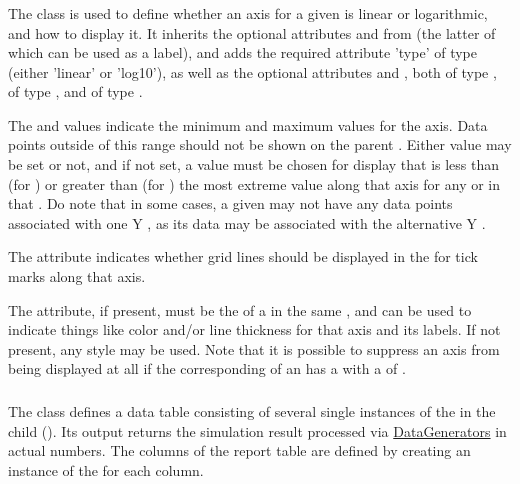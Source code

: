 \begin{blockChanged}
\subsubsection{}
\label{class:axis}
The \Axis class is used to define whether an axis for a given \Plot is linear or logarithmic, and how to display it.  It inherits the optional attributes  and  from \SedBase (the latter of which can be used as a label), and adds the required attribute 'type' of type \AxisKind (either 'linear' or 'log10'), as well as the optional attributes  and , both of type ,  of type , and  of type .

The  and  values indicate the minimum and maximum values for the axis.  Data points outside of this range should not be shown on the parent \Plot.  Either value may be set or not, and if not set, a value must be chosen for display that is less than (for ) or greater than (for ) the most extreme value along that axis for any \Curve or \Surface in that \Plot.  Do note that in some cases, a given \Curve may not have any data points associated with one Y \Axis, as its data may be associated with the alternative Y \Axis.

The  attribute indicates whether grid lines should be displayed in the \Plot for tick marks along that axis.

The  attribute, if present, must be the  of a \Style in the same \SedDocument, and can be used to indicate things like color and/or line thickness for that axis and its labels.  If not present, any style may be used.  Note that it is possible to suppress an axis from being displayed at all if the corresponding \Style of an \Axis has a  with a  of .



\end{blockChanged}
%


\subsubsection{}
\label{class:report}
The  class defines a data table consisting of several single instances of the \DataSet in the child  (). Its output returns the simulation result processed via \hyperref[class:dataGenerator]{DataGenerators} in actual numbers. The columns of the report table are defined by creating an instance of the \DataSet for each column. 

